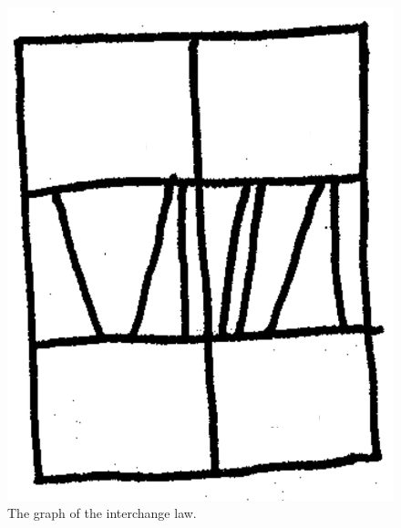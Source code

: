 \begin{figure}[H]
\centering
\includegraphics[scale=0.1]{img/interchange.png}
\caption{The graph of the interchange law.}
\label{fig:interchange}
\end{figure}

